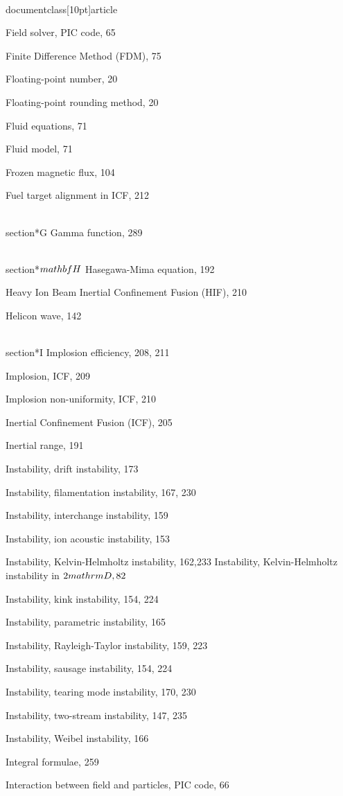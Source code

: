 \\documentclass[10pt]{article}
\begin{document}
{{{{{{Field solver, PIC code, 65

Finite Difference Method (FDM), 75

Floating-point number, 20

Floating-point rounding method, 20

Fluid equations, 71

Fluid model, 71

Frozen magnetic flux, 104

Fuel target alignment in ICF, 212

\\section*{G}
Gamma function, 289

\\section*{$\\mathbf{H}$}
Hasegawa-Mima equation, 192

Heavy Ion Beam Inertial Confinement Fusion (HIF), 210

Helicon wave, 142

\\section*{I}
Implosion efficiency, 208, 211

Implosion, ICF, 209

Implosion non-uniformity, ICF, 210

Inertial Confinement Fusion (ICF), 205

Inertial range, 191

Instability, drift instability, 173

Instability, filamentation instability, 167, 230

Instability, interchange instability, 159

Instability, ion acoustic instability, 153

Instability, Kelvin-Helmholtz instability, 162,233
Instability, Kelvin-Helmholtz instability in $2 \\mathrm{D}, 82$

Instability, kink instability, 154, 224

Instability, parametric instability, 165

Instability, Rayleigh-Taylor instability, 159, 223

Instability, sausage instability, 154, 224

Instability, tearing mode instability, 170, 230

Instability, two-stream instability, 147, 235

Instability, Weibel instability, 166

Integral formulae, 259

Interaction between field and particles, PIC code, 66

}}}}}}
\end{document}

